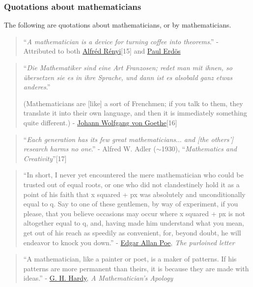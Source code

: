 \documentclass{article}
\begin{document}
\subsubsection{Quotations about mathematicians}
The following are quotations about mathematicians, or by mathematicians.
\begin{quotation}
	``\textit{A mathematician is a device for turning coffee into theorems}.'' - Attributed to both \href{https://en.wikipedia.org/wiki/Alfr%C3%A9d_R%C3%A9nyi}{Alfréd Rényi}[15] and \href{https://en.wikipedia.org/wiki/Paul_Erd%C5%91s}{Paul Erd\"os}
\end{quotation}

\begin{quotation}
	``\textit{Die Mathematiker sind eine Art Franzosen; redet man mit ihnen, so übersetzen sie es in ihre Sprache, und dann ist es alsobald ganz etwas anderes}.''
	
	(Mathematicians are [like] a sort of Frenchmen; if you talk to them, they translate it into their own language, and then it is immediately something quite different.) - \href{https://en.wikipedia.org/wiki/Johann_Wolfgang_von_Goethe}{Johann Wolfgang von Goethe}[16]
\end{quotation}

\begin{quotation}
	``\textit{Each generation has its few great mathematicians$\ldots$ and [the others'] research harms no one}.'' - Alfred W. Adler ($\sim$1930), ``\textit{Mathematics and Creativity}''[17]
\end{quotation}

\begin{quotation}
	``In short, I never yet encountered the mere mathematician who could be trusted out of equal roots, or one who did not clandestinely hold it as a point of his faith that x squared + px was absolutely and unconditionally equal to q. Say to one of these gentlemen, by way of experiment, if you please, that you believe occasions may occur where x squared + px is not altogether equal to q, and, having made him understand what you mean, get out of his reach as speedily as convenient, for, beyond doubt, he will endeavor to knock you down.'' - \href{https://en.wikipedia.org/wiki/Edgar_Allan_Poe}{Edgar Allan Poe}, \textit{The purloined letter}
\end{quotation}

\begin{quotation}
	``A mathematician, like a painter or poet, is a maker of patterns. If his patterns are more permanent than theirs, it is because they are made with ideas.'' - \href{https://en.wikipedia.org/wiki/G._H._Hardy}{G. H. Hardy}, \textit{A Mathematician's Apology}
\end{quotation}
\end{document}
